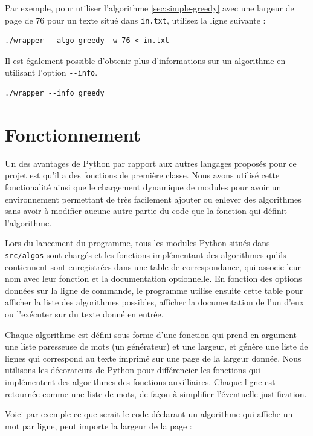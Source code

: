 \documentclass[a4paper, 11pt]{article}
\begin{document}
Par exemple, pour utiliser l'algorithme \ref{sec:simple-greedy} avec une largeur
de page de 76 pour un texte situé dans \verb|in.txt|, utilisez la ligne suivante
:

\begin{verbatim}
./wrapper --algo greedy -w 76 < in.txt
\end{verbatim}

Il est également possible d'obtenir plus d'informations sur un algorithme en
utilisant l'option \verb|--info|.

\begin{verbatim}
./wrapper --info greedy
\end{verbatim}

\section{Fonctionnement}

Un des avantages de Python par rapport aux autres langages proposés pour ce
projet est qu'il a des fonctions de première classe. Nous avons utilisé cette
fonctionalité ainsi que le chargement dynamique de modules pour avoir un
environnement permettant de très facilement ajouter ou enlever des algorithmes
sans avoir à modifier aucune autre partie du code que la fonction qui définit
l'algorithme.

Lors du lancement du programme, tous les modules Python situés dans
\verb|src/algos| sont chargés et les fonctions implémentant des algorithmes
qu'ils contiennent sont enregistrées dans une table de correspondance, qui
associe leur nom avec leur fonction et la documentation optionnelle. En fonction
des options données sur la ligne de commande, le programme utilise ensuite cette
table pour afficher la liste des algorithmes possibles, afficher la
documentation de l'un d'eux ou l'exécuter sur du texte donné en entrée.

Chaque algorithme est défini sous forme d'une fonction qui prend en argument une
liste paresseuse de mots (un générateur) et une largeur, et génère une liste
de lignes qui correspond au texte imprimé sur une page de la largeur donnée.
Nous utilisons les décorateurs de Python pour différencier les fonctions qui
implémentent des algorithmes des fonctions auxilliaires. Chaque ligne est
retournée comme une liste de mots, de façon à simplifier l'éventuelle
justification.

Voici par exemple ce que serait le code déclarant un algorithme qui affiche un
mot par ligne, peut importe la largeur de la page :
\end{document}
